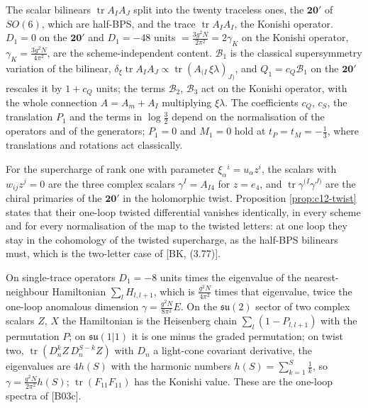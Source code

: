 \begin{remark}
The scalar bilinears $\operatorname{tr}A_IA_J$ split into the twenty traceless ones, the $\mathbf{20}'$ of $SO(6)$, which are half-BPS, and the trace $\operatorname{tr}A_IA_I$, the Konishi operator. $D_1=0$ on the $\mathbf{20}'$ and $D_1=-48$ units $=\tfrac{3g^2N}{2\pi^2}=2\gamma_K$ on the Konishi operator, $\gamma_K=\tfrac{3g^2N}{4\pi^2}$, are the scheme-independent content. $\mathcal B_1$ is the classical supersymmetry variation of the bilinear, $\delta_\xi\operatorname{tr}A_IA_J\propto\operatorname{tr}(A_{(I}\,\xi\lambda)_{J)}$, and $Q_1=c_Q\mathcal B_1$ on the $\mathbf{20}'$ rescales it by $1+c_Q$ units; the terms $\mathcal B_2$, $\mathcal B_3$ act on the Konishi operator, with the whole connection $A=A_m+A_I$ multiplying $\xi\lambda$. The coefficients $c_Q$, $c_S$, the translation $P_1$ and the terms in $\log\tfrac32$ depend on the normalisation of the operators and of the generators; $P_1=0$ and $M_1=0$ hold at $t_P=t_M=-\tfrac13$, where translations and rotations act classically.
\end{remark}

\begin{remark}
For the supercharge of rank one with parameter $\xi_\alpha{}^i=u_\alpha z^i$, the scalars with $w_{ij}z^j=0$ are the three complex scalars $\gamma^I=A_{I4}$ for $z=e_4$, and $\operatorname{tr}\gamma^{(I}\gamma^{J)}$ are the chiral primaries of the $\mathbf{20}'$ in the holomorphic twist. Proposition \ref{prop:c12-twist} states that their one-loop twisted differential vanishes identically, in every scheme and for every normalisation of the map to the twisted letters: at one loop they stay in the cohomology of the twisted supercharge, as the half-BPS bilinears must, which is the two-letter case of [BK, (3.77)].
\end{remark}

\begin{remark}
On single-trace operators $D_1=-8$ units times the eigenvalue of the nearest-neighbour Hamiltonian $\sum_lH_{l,l+1}$, which is $\tfrac{g^2N}{4\pi^2}$ times that eigenvalue, twice the one-loop anomalous dimension $\gamma=\tfrac{g^2N}{8\pi^2}E$. On the $\mathfrak{su}(2)$ sector of two complex scalars $Z$, $X$ the Hamiltonian is the Heisenberg chain $\sum_l(1-P_{l,l+1})$ with the permutation $P$; on $\mathfrak{su}(1|1)$ it is one minus the graded permutation; on twist two, $\operatorname{tr}(D_n^kZ\,D_n^{S-k}Z)$ with $D_n$ a light-cone covariant derivative, the eigenvalues are $4h(S)$ with the harmonic numbers $h(S)=\sum_{k=1}^S\tfrac1k$, so $\gamma=\tfrac{g^2N}{2\pi^2}h(S)$; $\operatorname{tr}(F_{11}F_{11})$ has the Konishi value. These are the one-loop spectra of [B03c].
\end{remark}
